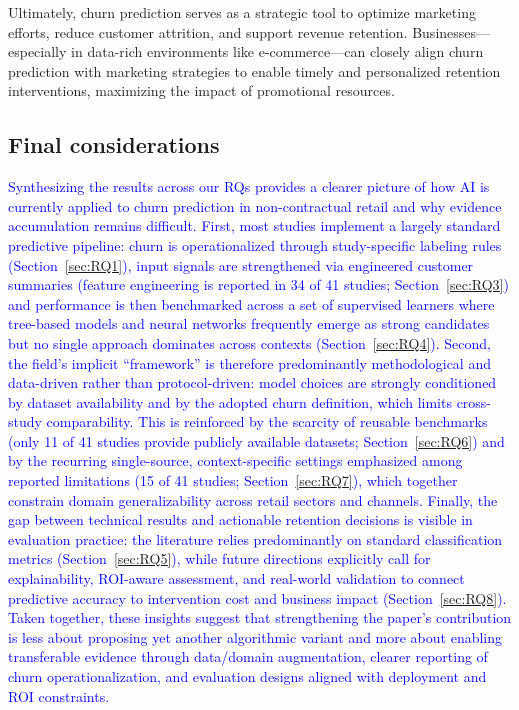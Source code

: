 
Ultimately, churn prediction serves as a strategic tool to optimize marketing efforts, reduce customer attrition, and support revenue retention. Businesses---especially in data-rich environments like e-commerce---can closely align churn prediction with marketing strategies to enable timely and personalized retention interventions, maximizing the impact of promotional resources.

\subsection{Final considerations}\nopagebreak
\noindent
\textcolor{blue}{Synthesizing the results across our RQs provides a clearer picture of how AI is currently applied to churn prediction in non-contractual retail and why evidence accumulation remains difficult. First, most studies implement a largely standard predictive pipeline: churn is operationalized through study-specific labeling rules (Section~\ref{sec:RQ1}), input signals are strengthened via engineered customer summaries (feature engineering is reported in 34 of 41 studies; Section~\ref{sec:RQ3}) and performance is then benchmarked across a set of supervised learners where tree-based models and neural networks frequently emerge as strong candidates but no single approach dominates across contexts (Section~\ref{sec:RQ4}). Second, the field’s implicit ``framework'' is therefore predominantly methodological and data-driven rather than protocol-driven: model choices are strongly conditioned by dataset availability and by the adopted churn definition, which limits cross-study comparability. This is reinforced by the scarcity of reusable benchmarks (only 11 of 41 studies provide publicly available datasets; Section~\ref{sec:RQ6}) and by the recurring single-source, context-specific settings emphasized among reported limitations (15 of 41 studies; Section~\ref{sec:RQ7}), which together constrain domain generalizability across retail sectors and channels. Finally, the gap between technical results and actionable retention decisions is visible in evaluation practice: the literature relies predominantly on standard classification metrics (Section~\ref{sec:RQ5}), while future directions explicitly call for explainability, ROI-aware assessment, and real-world validation to connect predictive accuracy to intervention cost and business impact (Section~\ref{sec:RQ8}). Taken together, these insights suggest that strengthening the paper’s contribution is less about proposing yet another algorithmic variant and more about enabling transferable evidence through data/domain augmentation, clearer reporting of churn operationalization, and evaluation designs aligned with deployment and ROI constraints.}

